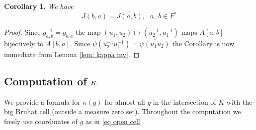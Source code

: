 \documentclass[12pt]{amsart}
\newtheorem{corollary}[theorem]{Corollary}%
\theoremstyle{remark}
\begin{document}
\begin{corollary}\label{cor: Jfeq}
We have
\[
J(b,a)=\overline{J(a,b)},\ \ \ a,\, b\in F^*
\]
\end{corollary}
\begin{proof}
Since $g_{a,b}^{-1}=g_{b,a}$ the map $(u_1,u_2)\mapsto (u_2^{-1},u_1^{-1})$ maps $A[a,b]$ bijectively to $A[b,a]$. Since $\psi(u_2^{-1}u_1^{-1})=\overline{\psi(u_1u_2)}$ the Corollary is now immediate from Lemma \ref{lem: kappa inv}.
\end{proof}


\subsection{Computation of $\kappa$}
We provide a formula for $\kappa(g)$ for almost all $g$ in the intersection of $K$ with the big Bruhat cell (outside a measure zero set). 
Throughout the computation we freely use coordinates of $g$ as in \eqref{eq open cell}. 
\end{document}
